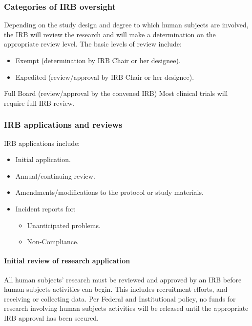 \documentclass[]{book}
\providecommand{\tightlist}{%
  \setlength{\itemsep}{0pt}\setlength{\parskip}{0pt}}
\theoremstyle{definition}
\theoremstyle{definition}
\theoremstyle{definition}
\theoremstyle{remark}
\begin{document}
\subsubsection{Categories of IRB
oversight}\label{categories-of-irb-oversight}

Depending on the study design and degree to which human subjects are
involved, the IRB will review the research and will make a determination
on the appropriate review level. The basic levels of review include:

\begin{itemize}
\tightlist
\item
  Exempt (determination by IRB Chair or her designee).
\item
  Expedited (review/approval by IRB Chair or her designee).
\end{itemize}

Full Board (review/approval by the convened IRB) Most clinical trials
will require full IRB review.

\subsubsection{IRB applications and
reviews}\label{irb-applications-and-reviews}

IRB applications include:

\begin{itemize}
\tightlist
\item
  Initial application.
\item
  Annual/continuing review.
\item
  Amendments/modifications to the protocol or study materials.
\item
  Incident reports for:

  \begin{itemize}
  \tightlist
  \item
    Unanticipated problems.
  \item
    Non-Compliance.
  \end{itemize}
\end{itemize}

\paragraph{Initial review of research
application}\label{initial-review-of-research-application}

All human subjects' research must be reviewed and approved by an IRB
before human subjects activities can begin. This includes recruitment
efforts, and receiving or collecting data. Per Federal and Institutional
policy, no funds for research involving human subjects activities will
be released until the appropriate IRB approval has been secured.
\end{document}
